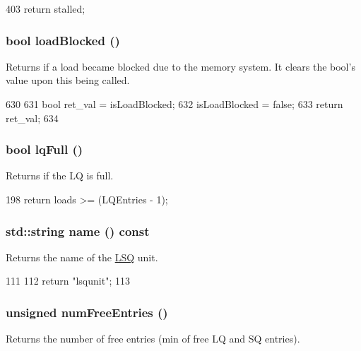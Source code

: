 \begin{DoxyCode}
403 { return stalled; }
\end{DoxyCode}
\hypertarget{classOzoneLSQ_a05c413ba417c6453e99f75d87c958590}{
\subsubsection[{loadBlocked}]{\setlength{\rightskip}{0pt plus 5cm}bool loadBlocked ()}}
\label{classOzoneLSQ_a05c413ba417c6453e99f75d87c958590}
Returns if a load became blocked due to the memory system. It clears the bool's value upon this being called. 


\begin{DoxyCode}
630 {
631     bool ret_val = isLoadBlocked;
632     isLoadBlocked = false;
633     return ret_val;
634 }
\end{DoxyCode}
\hypertarget{classOzoneLSQ_a5893daf623130be826f492bbff58f757}{
\subsubsection[{lqFull}]{\setlength{\rightskip}{0pt plus 5cm}bool lqFull ()}}
\label{classOzoneLSQ_a5893daf623130be826f492bbff58f757}
Returns if the LQ is full. 


\begin{DoxyCode}
198 { return loads >= (LQEntries - 1); }
\end{DoxyCode}
\hypertarget{classOzoneLSQ_a37627d5d5bba7f4a8690c71c2ab3cb07}{
\subsubsection[{name}]{\setlength{\rightskip}{0pt plus 5cm}std::string name () const}}
\label{classOzoneLSQ_a37627d5d5bba7f4a8690c71c2ab3cb07}
Returns the name of the \hyperlink{classLSQ}{LSQ} unit. 


\begin{DoxyCode}
111 {
112     return "lsqunit";
113 }
\end{DoxyCode}
\hypertarget{classOzoneLSQ_a028971a565aca048c67ea1c36a6a9d51}{
\subsubsection[{numFreeEntries}]{\setlength{\rightskip}{0pt plus 5cm}unsigned numFreeEntries ()}}
\label{classOzoneLSQ_a028971a565aca048c67ea1c36a6a9d51}
Returns the number of free entries (min of free LQ and SQ entries). 


